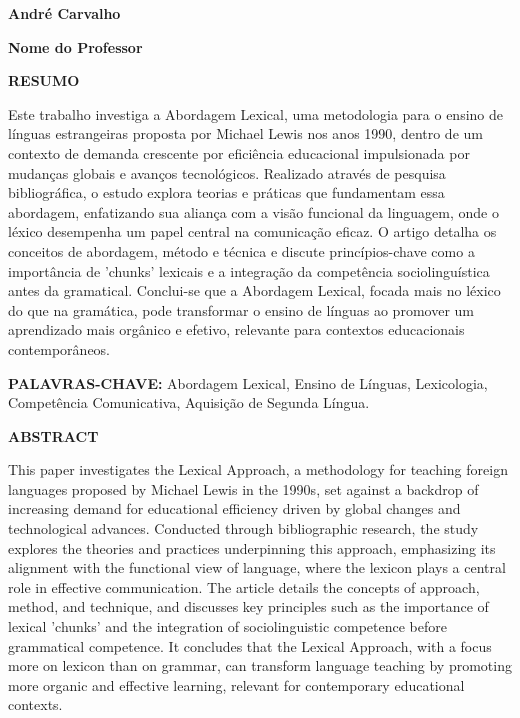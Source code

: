 \documentclass[
    a4paper,          %
    12pt,             %
    section=TITLE,    %
    subsection=Title, %
    oneside,          %
    english,          %
    spanish,          %
    brazil,           %
    fleqn             %
]{abntex2}
\begin{document}
	

  \begin{flushright}
    \textbf{André Carvalho}

    \textbf{Nome do Professor}
  \end{flushright}

  \begin{center}
      \Large \textbf{RESUMO}
  \end{center}
  \noindent
  Este trabalho investiga a Abordagem Lexical, uma metodologia para o ensino de línguas estrangeiras proposta por Michael Lewis nos anos 1990, dentro de um contexto de demanda crescente por eficiência educacional impulsionada por mudanças globais e avanços tecnológicos. Realizado através de pesquisa bibliográfica, o estudo explora teorias e práticas que fundamentam essa abordagem, enfatizando sua aliança com a visão funcional da linguagem, onde o léxico desempenha um papel central na comunicação eficaz. O artigo detalha os conceitos de abordagem, método e técnica e discute princípios-chave como a importância de 'chunks' lexicais e a integração da competência sociolinguística antes da gramatical. Conclui-se que a Abordagem Lexical, focada mais no léxico do que na gramática, pode transformar o ensino de línguas ao promover um aprendizado mais orgânico e efetivo, relevante para contextos educacionais contemporâneos.

  \noindent \textbf{PALAVRAS-CHAVE:} Abordagem Lexical, Ensino de Línguas, Lexicologia, Competência Comunicativa, Aquisição de Segunda Língua.

  \begin{center}
      \Large \textbf{ABSTRACT}
  \end{center}

  \noindent
  This paper investigates the Lexical Approach, a methodology for teaching foreign languages proposed by Michael Lewis in the 1990s, set against a backdrop of increasing demand for educational efficiency driven by global changes and technological advances. Conducted through bibliographic research, the study explores the theories and practices underpinning this approach, emphasizing its alignment with the functional view of language, where the lexicon plays a central role in effective communication. The article details the concepts of approach, method, and technique, and discusses key principles such as the importance of lexical 'chunks' and the integration of sociolinguistic competence before grammatical competence. It concludes that the Lexical Approach, with a focus more on lexicon than on grammar, can transform language teaching by promoting more organic and effective learning, relevant for contemporary educational contexts.
\end{document}
